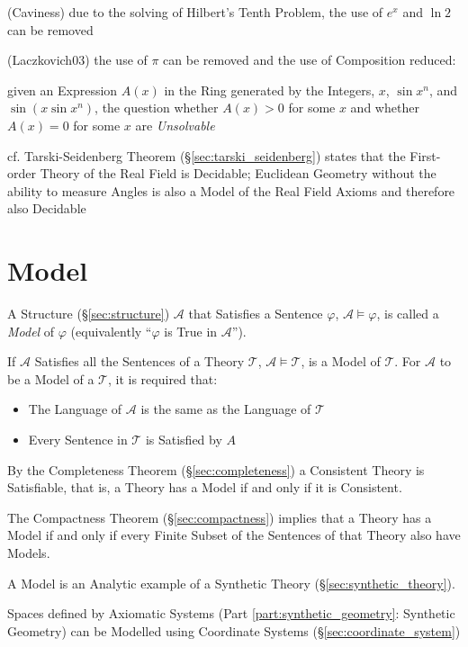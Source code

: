 (Caviness) due to the solving of Hilbert's Tenth Problem, the use of $e^x$ and
$\ln 2$ can be removed

(Laczkovich03) the use of $\pi$ can be removed and the use of Composition
reduced:

given an Expression $A(x)$ in the Ring generated by the Integers, $x$, $\sin
x^n$, and $\sin(x \sin x^n)$, the question whether $A(x) > 0$ for some $x$ and
whether $A(x) = 0$ for some $x$ are \emph{Unsolvable}

cf. Tarski-Seidenberg Theorem (\S\ref{sec:tarski_seidenberg}) states that the
First-order Theory of the Real Field is Decidable; Euclidean Geometry without
the ability to measure Angles is also a Model of the Real Field Axioms and
therefore also Decidable



\section{Model}\label{sec:model}

A Structure (\S\ref{sec:structure}) $\mathcal{A}$ that Satisfies a
Sentence $\varphi$, $\mathcal{A} \models \varphi$, is called a
\emph{Model} of $\varphi$ (equivalently ``$\varphi$ is True in
$\mathcal{A}$'').

If $\mathcal{A}$ Satisfies all the Sentences of a Theory
$\mathcal{T}$, $\mathcal{A} \models \mathcal{T}$, is a Model of
$\mathcal{T}$. For $\mathcal{A}$ to be a Model of a $\mathcal{T}$, it
is required that:
\begin{itemize}
  \item The Language of $\mathcal{A}$ is the same as the Language of
    $\mathcal{T}$
  \item Every Sentence in $\mathcal{T}$ is Satisfied by $A$
\end{itemize}
By the Completeness Theorem (\S\ref{sec:completeness}) a Consistent
Theory is Satisfiable, that is, a Theory has a Model if and only if it
is Consistent.

The Compactness Theorem (\S\ref{sec:compactness}) implies that a
Theory has a Model if and only if every Finite Subset of the Sentences
of that Theory also have Models.

A Model is an Analytic example of a Synthetic Theory
(\S\ref{sec:synthetic_theory}). \cite{shulman15}

Spaces defined by Axiomatic Systems (Part \ref{part:synthetic_geometry}:
Synthetic Geometry) can be Modelled using Coordinate Systems
(\S\ref{sec:coordinate_system})


